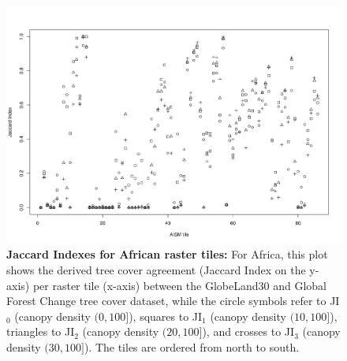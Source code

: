	\begin{landscape}
		\begin{figure}[ht]
			\centering
			\includegraphics[scale=.65]{img/jaccard_tiles_africa}
			\caption[Jaccard Indexes for African raster tiles]{\textbf{Jaccard Indexes for African raster tiles:} For Africa, this plot shows the derived tree cover agreement (Jaccard Index on the y-axis) per raster tile (x-axis) between the GlobeLand30 and Global Forest Change tree cover dataset, while the circle symbols refer to JI$_0$ (canopy density $(0,100]$), squares to JI$_1$ (canopy density $(10,100]$), triangles to JI$_2$ (canopy density $(20,100]$), and crosses to JI$_3$ (canopy density $(30,100]$). The tiles are ordered from north to south.}
			\label{fig:jaccard_africa_appendix}
		\end{figure}
	\end{landscape}

